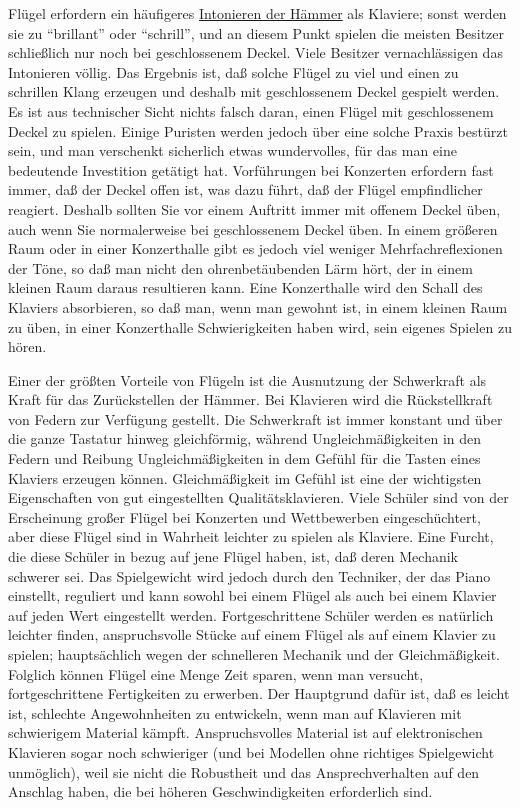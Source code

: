 Flügel erfordern ein häufigeres \hyperlink{c2_7_hamm}{Intonieren der Hämmer} als Klaviere; sonst werden sie zu \enquote{brillant} oder \enquote{schrill}, und an diesem Punkt spielen die meisten Besitzer schließlich nur noch bei geschlossenem Deckel.
Viele Besitzer vernachlässigen das Intonieren völlig.
Das Ergebnis ist, daß solche Flügel zu viel und einen zu schrillen Klang erzeugen und deshalb mit geschlossenem Deckel gespielt werden.
Es ist aus technischer Sicht nichts falsch daran, einen Flügel mit geschlossenem Deckel zu spielen.
Einige Puristen werden jedoch über eine solche Praxis bestürzt sein, und man verschenkt sicherlich etwas wundervolles, für das man eine bedeutende Investition getätigt hat.
Vorführungen bei Konzerten erfordern fast immer, daß der Deckel offen ist, was dazu führt, daß der Flügel empfindlicher reagiert.
Deshalb sollten Sie vor einem Auftritt immer mit offenem Deckel üben, auch wenn Sie normalerweise bei geschlossenem Deckel üben.
In einem größeren Raum oder in einer Konzerthalle gibt es jedoch viel weniger Mehrfachreflexionen der Töne, so daß man nicht den ohrenbetäubenden Lärm hört, der in einem kleinen Raum daraus resultieren kann.
Eine Konzerthalle wird den Schall des Klaviers absorbieren, so daß man, wenn man gewohnt ist, in einem kleinen Raum zu üben, in einer Konzerthalle Schwierigkeiten haben wird, sein eigenes Spielen zu hören.

Einer der größten Vorteile von Flügeln ist die Ausnutzung der Schwerkraft als Kraft für das Zurückstellen der Hämmer.
Bei Klavieren wird die Rückstellkraft von Federn zur Verfügung gestellt.
Die Schwerkraft ist immer konstant und über die ganze Tastatur hinweg gleichförmig, während Ungleichmäßigkeiten in den Federn und Reibung Ungleichmäßigkeiten in dem Gefühl für die Tasten eines Klaviers erzeugen können.
Gleichmäßigkeit im Gefühl ist eine der wichtigsten Eigenschaften von gut eingestellten Qualitätsklavieren.
Viele Schüler sind von der Erscheinung großer Flügel bei Konzerten und Wettbewerben eingeschüchtert, aber diese Flügel sind in Wahrheit leichter zu spielen als Klaviere.
Eine Furcht, die diese Schüler in bezug auf jene Flügel haben, ist, daß deren Mechanik schwerer sei.
Das Spielgewicht wird jedoch durch den Techniker, der das Piano einstellt, reguliert und kann sowohl bei einem Flügel als auch bei einem Klavier auf jeden Wert eingestellt werden.
Fortgeschrittene Schüler werden es natürlich leichter finden, anspruchsvolle Stücke auf einem Flügel als auf einem Klavier zu spielen; hauptsächlich wegen der schnelleren Mechanik und der Gleichmäßigkeit.
Folglich können Flügel eine Menge Zeit sparen, wenn man versucht, fortgeschrittene Fertigkeiten zu erwerben.
Der Hauptgrund dafür ist, daß es leicht ist, schlechte Angewohnheiten zu entwickeln, wenn man auf Klavieren mit schwierigem Material kämpft.
Anspruchsvolles Material ist auf elektronischen Klavieren sogar noch schwieriger (und bei Modellen ohne richtiges Spielgewicht unmöglich), weil sie nicht die Robustheit und das Ansprechverhalten auf den Anschlag haben, die bei höheren Geschwindigkeiten erforderlich sind.

